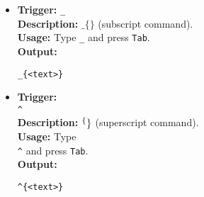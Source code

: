 \documentclass{article}
\begin{document}
\begin{itemize}[leftmargin=*, label={}]
\item \textbf{Trigger:} \texttt{\_} \\
\textbf{Description:} \(\_\{\}\) (subscript command). \\
\textbf{Usage:} Type \texttt{\_} and press \texttt{Tab}. \\
\textbf{Output:}
\begin{verbatim}
_{<text>}
\end{verbatim}

\item \textbf{Trigger:} \texttt{\\\^} \\
\textbf{Description:} \(\\^\{\}\) (superscript command). \\
\textbf{Usage:} Type \texttt{\\\^} and press \texttt{Tab}. \\
\textbf{Output:}
\begin{verbatim}
^{<text>}
\end{verbatim}
\end{itemize}
\end{document}
